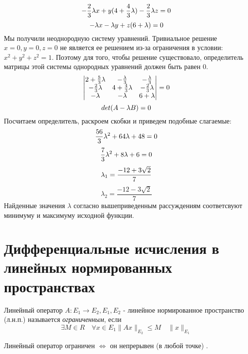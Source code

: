 \begin{solution}
\[    \]
    \[
        -\frac{2}{3}\lambda x + y(4+\frac{4}{3}\lambda)-\frac{2}{3}\lambda z=0\\
    \]
    \[
        -\lambda x - \lambda y + z(6+\lambda)=0\\
     \]
     Мы получили неоднородную систему уравнений. Тривиальное решение $x=0, y=0, z=0$ не является ее решением из-за ограничения в условии: $x^2+y^2+z^2=1$. Поэтому для того, чтобы решение существовало, определитель матрицы этой системы однородных уравнений должен быть равен $0$.
     \[
        \begin{vmatrix}
            2+\frac{5}{3}\lambda & -\frac{\lambda}{3} & -\frac{\lambda}{3}\\
            -\frac{2}{3}\lambda & 4+\frac{4}{3}\lambda & -\frac{2}{3}\lambda\\
            -\lambda & -\lambda & 6+\lambda
        \end{vmatrix} = 0\\
    \]
    \[
        det (A - \lambda B)=0 \\
     \]
     Посчитаем определитель, раскроем скобки и приведем подобные слагаемые:
     \[
        \frac{56}{3}\lambda^2 + 64\lambda+48=0\\
    \]
    \[
        \frac{7}{3}\lambda^2+8\lambda+6=0\\
    \]
    \[
        \lambda_1 = \frac{-12+3\sqrt{2}}{7}\\
    \]
    \[
        \lambda_2 = \frac{-12-3\sqrt{2}}{7}
     \]
    Найденные значения $\lambda$ согласно вышеприведенным рассуждениям соответсвуют минимуму и максимуму исходной функции.
\end{solution}

\section{Дифференциальные исчисления в линейных нормированных пространствах}
\begin{definition}
    Линейный оператор $A: E_1 \to E_2, E_1, E_2$ - линейное нормированное пространство (л.н.п.) называется \textit{ограниченным}, если 
    \[
        \exists M \in R \quad \forall x \in E_1 \| Ax \|_{E_2} \leq M \quad \| x \|_{E_1}
    \]
\end{definition}

\begin{proposition}
    Линейный оператор ограничен $\Leftrightarrow$ он непрерывен (в любой точке) .
\end{proposition}

